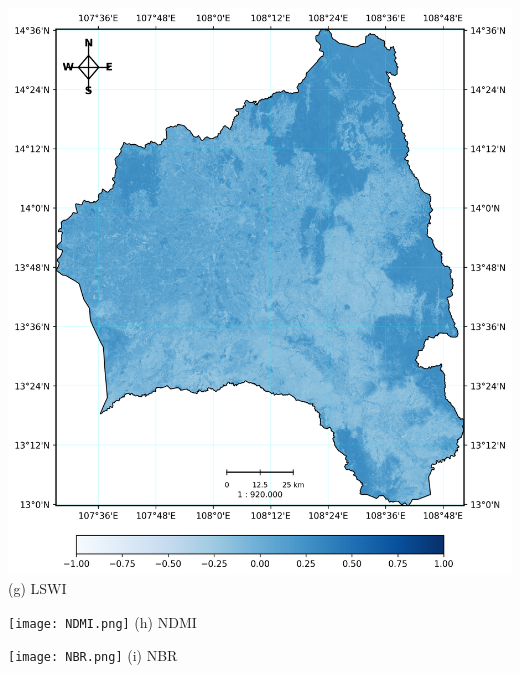 \documentclass{article}
\begin{document}
\noindent
\begin{minipage}{0.31\textwidth}
    \includegraphics[width=\textwidth]{LSWI.png}
    \centering (g) LSWI
\end{minipage}%
\hfill
\begin{minipage}{0.31\textwidth}
    \texttt{[image: NDMI.png]}
    \centering (h) NDMI
\end{minipage}%
\hfill
\begin{minipage}{0.31\textwidth}
    \texttt{[image: NBR.png]}
    \centering (i) NBR
\end{minipage}

\vspace{0.5em}
\end{document}
